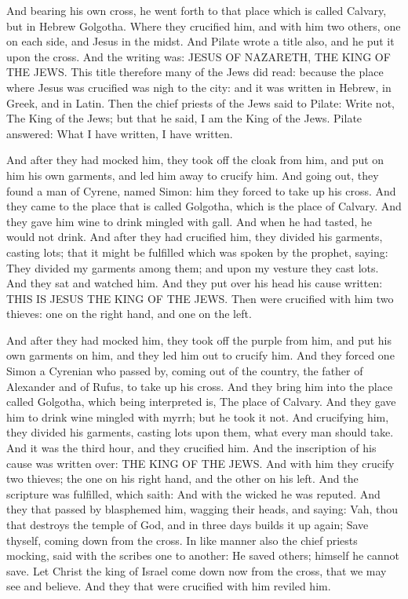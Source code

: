 And bearing his own cross, he went forth to that place which is called Calvary, but in Hebrew Golgotha. Where they crucified him, and with him two others, one on each side, and Jesus in the midst. And Pilate wrote a title also, and he put it upon the cross. And the writing was: JESUS OF NAZARETH, THE KING OF THE JEWS. This title therefore many of the Jews did read: because the place where Jesus was crucified was nigh to the city: and it was written in Hebrew, in Greek, and in Latin. Then the chief priests of the Jews said to Pilate: Write not, The King of the Jews; but that he said, I am the King of the Jews. Pilate answered: What I have written, I have written.

And after they had mocked him, they took off the cloak from him, and put on him his own garments, and led him away to crucify him. And going out, they found a man of Cyrene, named Simon: him they forced to take up his cross. And they came to the place that is called Golgotha, which is the place of Calvary. And they gave him wine to drink mingled with gall. And when he had tasted, he would not drink. And after they had crucified him, they divided his garments, casting lots; that it might be fulfilled which was spoken by the prophet, saying: They divided my garments among them; and upon my vesture they cast lots. And they sat and watched him. And they put over his head his cause written: THIS IS JESUS THE KING OF THE JEWS. Then were crucified with him two thieves: one on the right hand, and one on the left.

And after they had mocked him, they took off the purple from him, and put his own garments on him, and they led him out to crucify him. And they forced one Simon a Cyrenian who passed by, coming out of the country, the father of Alexander and of Rufus, to take up his cross. And they bring him into the place called Golgotha, which being interpreted is, The place of Calvary. And they gave him to drink wine mingled with myrrh; but he took it not. And crucifying him, they divided his garments, casting lots upon them, what every man should take. And it was the third hour, and they crucified him. And the inscription of his cause was written over: THE KING OF THE JEWS. And with him they crucify two thieves; the one on his right hand, and the other on his left. And the scripture was fulfilled, which saith: And with the wicked he was reputed. And they that passed by blasphemed him, wagging their heads, and saying: Vah, thou that destroys the temple of God, and in three days builds it up again; Save thyself, coming down from the cross. In like manner also the chief priests mocking, said with the scribes one to another: He saved others; himself he cannot save. Let Christ the king of Israel come down now from the cross, that we may see and believe. And they that were crucified with him reviled him.

